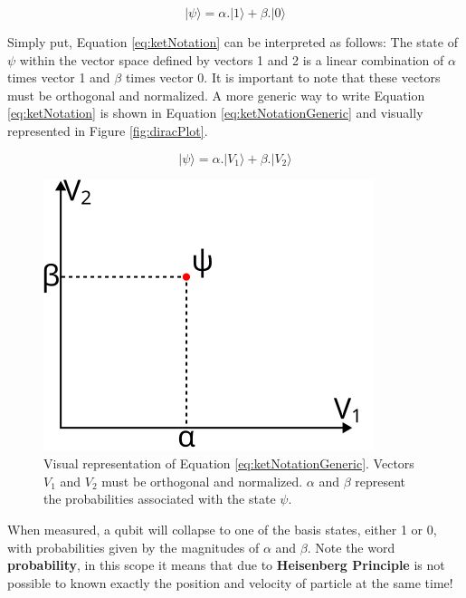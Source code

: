 		\begin{equation}
			| \psi \rangle = \alpha . | 1 \rangle + \beta . | 0 \rangle
			\label{eq:ketNotation}
		\end{equation}
		
		\par Simply put, Equation \ref{eq:ketNotation} can be interpreted as follows: The state of $\psi$ within the vector space defined by vectors 1 and 2 is a linear combination of $\alpha$ times vector 1 and $\beta$ times vector 0. It is important to note that these vectors must be orthogonal and normalized. A more generic way to write Equation \ref{eq:ketNotation} is shown in Equation \ref{eq:ketNotationGeneric} and visually represented in Figure \ref{fig:diracPlot}.
		
		\begin{equation}
			| \psi \rangle = \alpha . | V_1 \rangle + \beta . | V_2 \rangle
			\label{eq:ketNotationGeneric2}
		\end{equation}
		
		\begin{figure}[h]
			\centering
			\includegraphics{images/diracPlot}
			\caption{Visual representation of Equation \ref{eq:ketNotationGeneric}. Vectors $V_1$ and $V_2$ must be orthogonal and normalized. $\alpha$ and $\beta$ represent the probabilities associated with the state $\psi$.}
			\label{fig:diracPlot2}
		\end{figure}
		
		\par When measured, a qubit will collapse to one of the basis states, either 1 or 0, with probabilities given by the magnitudes of $\alpha$ and $\beta$. Note the word \textbf{probability}, in this scope it means that due to \textbf{Heisenberg Principle} is not possible to known exactly the position and velocity of particle at the same time!
		
